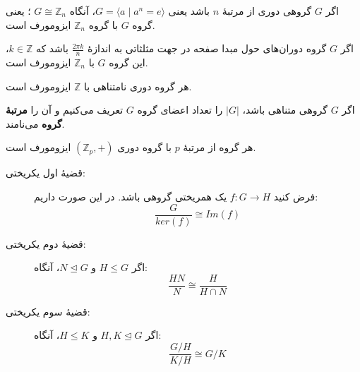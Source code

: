\begin{frame}
    \begin{example}
        اگر $G$ گروهی دوری از مرتبهٔ $n$ باشد یعنی $G = \langle a \mid a^n = e \rangle$، آنگاه $G \cong \mathbb{Z}_n$ ؛ یعنی گروه $G$ با گروه $\mathbb{Z}_n$ ایزومورف است.
    \end{example}

    \begin{example}
        اگر $G$ گروه دوران‌های حول مبدا صفحه در جهت مثلثاتی به اندازهٔ $\frac{2\pi k}{n}$ باشد که $k \in \mathbb{Z}$، این گروه $G$ با $\mathbb{Z}_n$ ایزومورف است.
    \end{example}

    \begin{example}
        هر گروه دوری نامتناهی با $\mathbb{Z}$ ایزومورف است.
    \end{example}

\end{frame}

\begin{frame}
    \begin{definition}
        اگر
        $G$
        گروهی متناهی باشد،
        $|G|$
        را تعداد اعضای گروه
        $G$
        تعریف می‌کنیم و آن را
        \textbf{مرتبهٔ گروه} می‌نامند.
    \end{definition}



    \begin{example}
        هر گروه از مرتبهٔ
        $p$
        با گروه دوری $(\mathbb{Z}_p,+)$ ایزومورف است.
    \end{example}



\end{frame}

\begin{frame}
    \begin{theorem}
        \begin{description}
            \item[قضیهٔ اول یکریختی:]
                  فرض کنید $f \colon G \to H$ یک همریختی گروهی باشد. در این صورت داریم:
                  \[
                      \frac{G}{ker(f)} \cong Im(f)
                  \]

            \item[قضیهٔ دوم یکریختی:]
                  اگر $H \leq G$ و $N \trianglelefteq G$، آنگاه:
                  \[
                      \frac{HN}{N} \cong \frac{H}{H \cap N}
                  \]

            \item[قضیهٔ سوم یکریختی:]
                  اگر
                  $H, K \trianglelefteq G$
                  و
                  $H \leq K $، آنگاه:
                  \[
                      \frac{G/H}{K/H} \cong G/K
                  \]
        \end{description}
    \end{theorem}



\end{frame}


